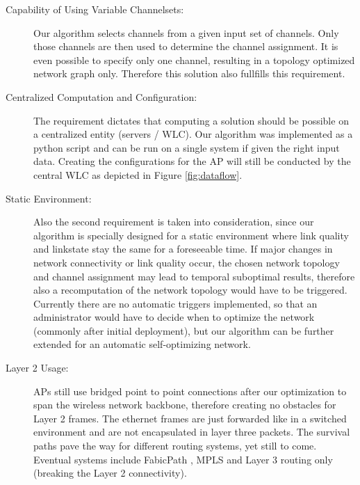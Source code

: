 \begin{description}
	\item[Capability of Using Variable Channelsets:]
	  Our algorithm selects channels from a given input set of channels. Only those channels are then used to determine the channel assignment.
	  It is even possible to specify only one channel, resulting in a topology optimized network graph only.
	  Therefore this solution also fullfills this requirement.  
	  
	\item[Centralized Computation and Configuration:]
	  The requirement dictates that computing a solution should be possible on a centralized entity (servers / \ac{WLC}).
	  Our algorithm was implemented as a python script and can be run on a single system if given the right input data.
	  Creating the configurations for the \ac{AP} will still be conducted by the central WLC as depicted in Figure \ref{fig:dataflow}.
	  
	\item[Static Environment:]
	  Also the second requirement is taken into consideration, since our algorithm is specially designed for a static environment where link quality 
	  and linkstate stay the same for a foreseeable time.
	  If major changes in network connectivity or link quality occur, the chosen network topology and channel assignment
	  may lead to temporal suboptimal results, therefore also a recomputation of the network topology would have to be triggered.
	  Currently there are no automatic triggers implemented, so that an administrator would have to decide when to optimize the network (commonly after initial deployment),
	  but our algorithm can be further extended for an automatic self-optimizing network.
	  
	\item[Layer 2 Usage:]
	  APs still use bridged point to point connections after our optimization to span the wireless network backbone, therefore creating no obstacles for Layer 2 frames.
	  The ethernet frames are just forwarded like in a switched environment and are not encapsulated in layer three packets.
	  The survival paths pave the way for different routing systems, yet still to come. Eventual systems include FabicPath \cite{fabricpath}, \ac{MPLS} \cite{mpls} and 
	  Layer 3 routing only (breaking the Layer 2 connectivity).
	  

\end{description}

